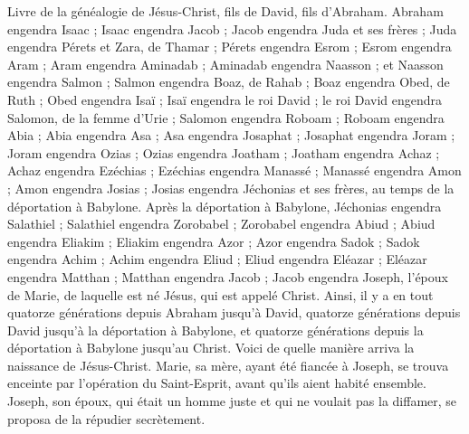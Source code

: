 \begin{multicols}{2}
\VerseOne{}Livre de la généalogie de Jésus-Christ, fils de David, fils d’Abraham.
Abraham engendra Isaac ; Isaac engendra Jacob ; Jacob engendra Juda et ses frères ;
Juda engendra Pérets et Zara, de Thamar ; Pérets engendra Esrom ; Esrom engendra Aram ;
Aram engendra Aminadab ; Aminadab engendra Naasson ; et Naasson engendra Salmon ;
Salmon engendra Boaz, de Rahab ; Boaz engendra Obed, de Ruth ; Obed engendra Isaï ;
Isaï engendra le roi David ; le roi David engendra Salomon, de la femme d'Urie ;
Salomon engendra Roboam ; Roboam engendra Abia ; Abia engendra Asa ;
Asa engendra Josaphat ; Josaphat engendra Joram ; Joram engendra Ozias ;
Ozias engendra Joatham ; Joatham engendra Achaz ; Achaz engendra Ezéchias ;
Ezéchias engendra Manassé ; Manassé engendra Amon ; Amon engendra Josias ;
Josias engendra Jéchonias et ses frères, au temps de la déportation à Babylone.
Après la déportation à Babylone, Jéchonias engendra Salathiel ; Salathiel engendra Zorobabel ;
Zorobabel engendra Abiud ; Abiud engendra Eliakim ; Eliakim engendra Azor ;
Azor engendra Sadok ; Sadok engendra Achim ; Achim engendra Eliud ;
Eliud engendra Eléazar ; Eléazar engendra Matthan ; Matthan engendra Jacob ;
Jacob engendra Joseph, l’époux de Marie, de laquelle est né Jésus, qui est appelé Christ.
Ainsi, il y a en tout quatorze générations depuis Abraham jusqu'à David, quatorze générations depuis David jusqu'à la déportation à Babylone, et quatorze générations depuis la déportation à Babylone jusqu'au Christ.
Voici de quelle manière arriva la naissance de Jésus-Christ. Marie, sa mère, ayant été fiancée à Joseph, se trouva enceinte par l’opération du Saint-Esprit, avant qu'ils aient habité ensemble.
Joseph, son époux, qui était un homme juste et qui ne voulait pas la diffamer, se proposa de la répudier secrètement.

\end{multicols}
